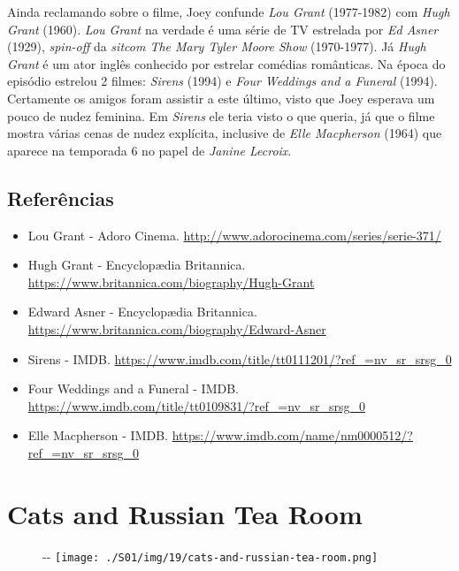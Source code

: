 Ainda reclamando sobre o filme, Joey confunde \emph{Lou Grant}
(1977-1982) com \emph{Hugh Grant} (1960). \emph{Lou Grant} na verdade é
uma série de TV estrelada por \emph{Ed Asner} (1929), \emph{spin-off} da
\emph{sitcom The Mary Tyler Moore Show} (1970-1977). Já \emph{Hugh
Grant} é um ator inglês conhecido por estrelar comédias românticas. Na
época do episódio estrelou 2 filmes: \emph{Sirens} (1994) e \emph{Four
Weddings and a Funeral} (1994). Certamente os amigos foram assistir a
este último, visto que Joey esperava um pouco de nudez feminina. Em
\emph{Sirens} ele teria visto o que queria, já que o filme mostra várias
cenas de nudez explícita, inclusive de \emph{Elle Macpherson} (1964) que
aparece na temporada 6 no papel de \emph{Janine Lecroix}.

\hypertarget{referuxeancias-1}{%
\subsection{Referências}\label{referuxeancias-1}}

\begin{itemize}
\tightlist
\item
  \sloppy Lou Grant - Adoro Cinema. \url{http://www.adorocinema.com/series/serie-371/}
\item
  \sloppy Hugh Grant - Encyclopædia Britannica. \url{https://www.britannica.com/biography/Hugh-Grant}
\item
  \sloppy Edward Asner - Encyclopædia Britannica. \url{https://www.britannica.com/biography/Edward-Asner}
\item
  \sloppy Sirens - IMDB. \url{https://www.imdb.com/title/tt0111201/?ref_=nv_sr_srsg_0}
\item
  \sloppy Four Weddings and a Funeral - IMDB. \url{https://www.imdb.com/title/tt0109831/?ref_=nv_sr_srsg_0}
\item
  \sloppy Elle Macpherson - IMDB. \url{https://www.imdb.com/name/nm0000512/?ref_=nv_sr_srsg_0}
\end{itemize}

\hypertarget{cats-and-russian-tea-room}{%
\section{Cats and Russian Tea Room}\label{cats-and-russian-tea-room}}

\begin{figure}[!ht]
  \begin{adjustwidth}{-\oddsidemargin-1in}{-\rightmargin}
    \centering
    \texttt{[image: ./S01/img/19/cats-and-russian-tea-room.png]}
  \end{adjustwidth}
\end{figure}

